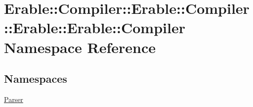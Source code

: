 \hypertarget{namespace_erable_1_1_compiler_1_1_erable_1_1_compiler_1_1_erable_1_1_erable_1_1_compiler}{}\section{Erable\+::Compiler\+::Erable\+::Compiler\+::Erable\+::Erable\+::Compiler Namespace Reference}
\label{namespace_erable_1_1_compiler_1_1_erable_1_1_compiler_1_1_erable_1_1_erable_1_1_compiler}
\subsection*{Namespaces}
\begin{DoxyCompactItemize}
\item 
 \mbox{\hyperlink{namespace_erable_1_1_compiler_1_1_erable_1_1_compiler_1_1_erable_1_1_erable_1_1_compiler_1_1_parser}{Parser}}
\end{DoxyCompactItemize}
